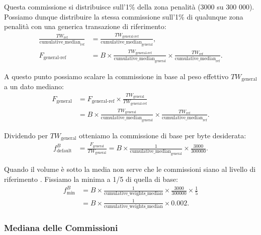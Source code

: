 Questa commissione si distribuisce sull'1\% della zona penalità (3000 su 300 000). Possiamo dunque distribuire la stessa commissione sull'1\% di qualunque zona penalità con una generica transazione di riferimento:\vspace{.175cm}
\begin{align*}
  \tfrac{TW_{\text{ref}}}{\text{cumulative\_median}_{\text{ref}}}
    &= \tfrac{TW_{\text{general-ref}}}{\text{cumulative\_median}_{\text{general}}},\\
  F_{\text{general-ref}}
    &= B \times \tfrac{TW_{\text{general-ref}}}{\text{cumulative\_median}_{\text{general}}}
           \times \tfrac{TW_{\text{ref}}}{\text{cumulative\_median}_{\text{ref}}}.
\end{align*}{}

A questo punto possiamo scalare la commissione in base al peso effettivo $TW_{\text{general}}$ a un dato mediano:\vspace{.175cm}
\begin{align*}
  F_{\text{general}} 
    &= F_{\text{general-ref}} \times \tfrac{TW_{\text{general}}}{TW_{\text{general-ref}}}\\
    &= B \times \tfrac{TW_{\text{general}}}{\text{cumulative\_median}_{\text{general}}}
           \times \tfrac{TW_{\text{ref}}}{\text{cumulative\_median}_{\text{ref}}}.
\end{align*}{}

Dividendo per $TW_{\text{general}}$ otteniamo la commissione di base per byte desiderata:\vspace{.175cm}
\begin{align*}
  f^B_{\text{default}}
    &= \tfrac{F_{\text{general}}}{TW_{\text{general}}}
    = B \times \tfrac{1}{\text{cumulative\_median}_{\text{general}}}
      \times \tfrac{3000}{300000}.
\end{align*}{}

Quando il volume è sotto la media non serve che le commissioni siano al livello di riferimento \cite{jollymore-old-analysis}. Fissiamo la minima a 1/5 di quella di base:\vspace{.175cm}
\begin{align*}
  f^B_{\min}
    &= B \times \tfrac{1}{\text{cumulative\_weights\_median}}
      \times \tfrac{3000}{300000} \times \tfrac{1}{5}\\
    &= B \times \tfrac{1}{\text{cumulative\_weights\_median}}
      \times 0.002.
\end{align*}{}

\subsubsection*{Mediana delle Commissioni}

